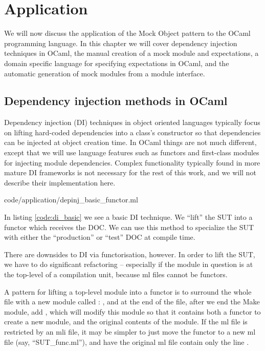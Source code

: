 \chapter{Application}
\label{application}

We will now discuss the application of the Mock Object pattern to the
OCaml programming language. In this chapter we will cover dependency
injection techniques in OCaml, the manual creation of a mock module
and expectations, a domain specific language for specifying
expectations in OCaml, and the automatic generation of mock modules
from a module interface.

\section{Dependency injection methods in OCaml}
\label{application:di}

Dependency injection (DI) techniques in object oriented languages
typically focus on lifting hard-coded dependencies into a class's
constructor so that dependencies can be injected at object creation
time. In OCaml things are not much different, except that we will use
language features such as functors and first-class modules for
injecting module dependencies. Complex functionality typically found
in more mature DI frameworks is not necessary for the rest of this
work, and we will not describe their implementation here.


 {code/application/depinj_basic_functor.ml}

In listing \ref{code:di_basic} we see a basic DI technique. We
``lift'' the SUT into a functor which receives the DOC. We can use
this method to specialize the SUT with either the ``production'' or
``test'' DOC at compile time.

There are downsides to DI via functorisation, however. In order to
lift the SUT, we have to do significant refactoring -- especially if
the module in question is at the top-level of a compilation unit,
because ml files cannot be functors.

A pattern for lifting a top-level module into a functor is to surround
the whole file with a new module called : , and at the end of the file, after we end
the Make module, add , which will modify this
module so that it contains both a functor to create a new module, and
the original contents of the module. If the ml file is restricted by
an mli file, it may be simpler to just move the functor to a new ml
file (say, ``SUT\_func.ml''), and have the original ml file contain only
the line .

